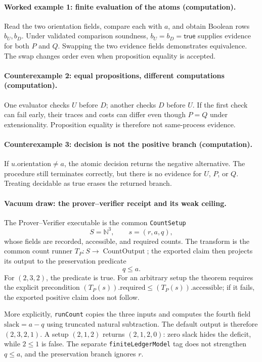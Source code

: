 \paragraph{Worked example 1: finite evaluation of the atoms (computation).}
Read the two orientation fields, compare each with \(a\), and obtain Boolean rows \(b_U,b_D\).  Under validated
comparison soundness, \(b_U=b_D=\mathsf{true}\) supplies evidence for both \(P\) and \(Q\).  Swapping the two evidence
fields demonstrates equivalence.  The swap changes order even when proposition equality is accepted.

\paragraph{Counterexample 2: equal propositions, different computations (computation).}
One evaluator checks \(U\) before \(D\); another checks \(D\) before \(U\).  If the first check can fail early, their
traces and costs can differ even though \(P=Q\) under extensionality.  Proposition equality is therefore not
same-process evidence.

\paragraph{Counterexample 3: decision is not the positive branch (computation).}
If \(u.\mathrm{orientation}\ne a\), the atomic decision returns the negative alternative.  The procedure still
terminates correctly, but there is no evidence for \(U\), \(P\), or \(Q\).  Treating decidable as true erases the
returned branch.

\paragraph{Vacuum draw: the prover--verifier receipt and its weak ceiling.}
The Prover--Verifier executable is the common \texttt{CountSetup}
\[
                         S=\mathbb N^3,\qquad s=(r,a,q),
\]
whose fields are recorded, accessible, and required counts.  The transform is the common count runner
\(T_P:S\to\operatorname{CountOutput}\); the exported claim then projects its output to the preservation predicate
\[
                         q\le a.
\]
For \((2,3,2)\), the predicate is true.  For an arbitrary setup the theorem requires the explicit precondition
\((T_P(s)).\mathrm{required}\le(T_P(s)).\mathrm{accessible}\); if it fails, the exported positive claim does not
follow.

More explicitly, \texttt{runCount} copies the three inputs and computes the fourth field
\(\mathrm{slack}=a-q\) using truncated natural subtraction.  The default output is therefore \((2,3,2,1)\).
A setup \((2,1,2)\) returns \((2,1,2,0)\): zero slack hides the deficit, while \(2\le1\) is false.  The separate
\texttt{finiteLedgerModel} tag does not strengthen \(q\le a\), and the preservation branch ignores \(r\).

